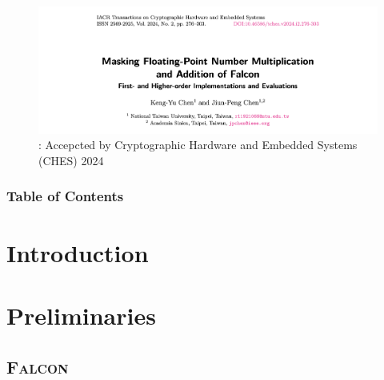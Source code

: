 

\usepackage[
    backend=biber,
    style=alphabetic,
    sorting=ynt
]{biblatex}


\renewcommand*{\bibfont}{\scriptsize}





\begin{frame}
\maketitle
\end{frame}


\begin{frame}
\begin{figure}
	\includegraphics[width=\textwidth]{Figure/paper_title.png}
	\caption*{\cite{TCHES:CC24}: Accepcted by Cryptographic Hardware and Embedded Systems (CHES) 2024}
\end{figure}
\end{frame}



\begin{frame}
\frametitle{Table of Contents}
\tableofcontents[hideothersubsections]

\end{frame}


\section{Introduction}




\section{Preliminaries}

\subsection{\textsc{Falcon}}



